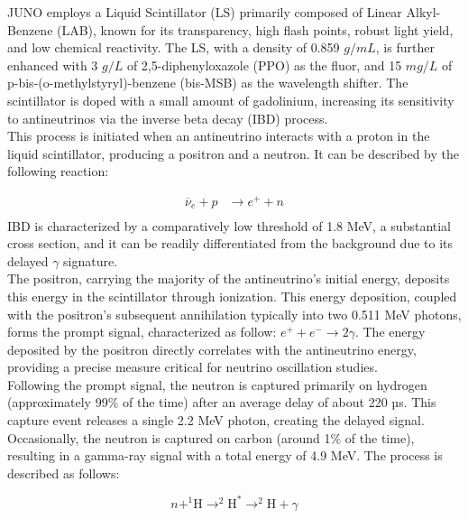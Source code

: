 JUNO employs a Liquid Scintillator (LS) primarily composed of Linear Alkyl-Benzene (LAB), known for its transparency, high flash points, robust light yield, and low chemical reactivity. The LS, with a density of 0.859 $g/mL$, is further enhanced with 3 $g/L$ of 2,5-diphenyloxazole (PPO) as the fluor, and 15 $mg/L$ of p-bis-(o-methylstyryl)-benzene (bis-MSB) as the wavelength shifter. The scintillator is doped with a small amount of gadolinium, increasing its sensitivity to antineutrinos via the inverse beta decay (IBD) process.\\

This process is initiated when an antineutrino interacts with a proton in the liquid scintillator, producing a positron and a neutron. It can be described by the following reaction:

\begin{equation}
	\begin{aligned}
		\overline{\nu}_e + p &\rightarrow e^+ + n \\
	\end{aligned}
\end{equation} 
IBD is characterized by a comparatively low threshold of 1.8 MeV, a substantial cross section, and it can be readily differentiated from the background due to its delayed $\gamma$ signature.\\

The positron, carrying the majority of the antineutrino's initial energy, deposits this energy in the scintillator through ionization. This energy deposition, coupled with the positron's subsequent annihilation typically into two 0.511 MeV photons, forms the prompt signal, characterized as follow: $e^{+} + e^{-} \rightarrow 2\gamma$.
The energy deposited by the positron directly correlates with the antineutrino energy, providing a precise measure critical for neutrino oscillation studies.\\

Following the prompt signal, the neutron is captured primarily on hydrogen (approximately 99$\%$ of the time) after an average delay of about 220 µs. This capture event releases a single 2.2 MeV photon, creating the delayed signal. Occasionally, the neutron is captured on carbon (around 1$\%$ of the time), resulting in a gamma-ray signal with a total energy of 4.9 MeV. The process is described as follows:

\begin{equation}
	 n + ^{1}\text{H} \rightarrow ^{2}\text{H}^{*} \rightarrow ^2\text{H} + \gamma
\end{equation}
 

